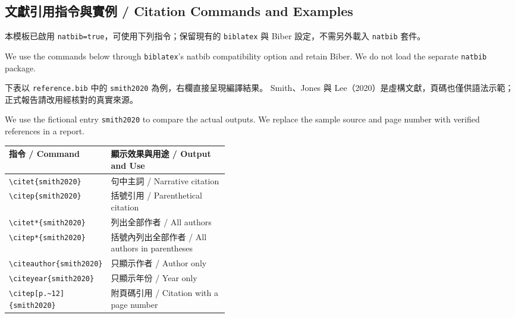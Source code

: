 \documentclass[11pt,a4paper]{article}
\begin{document}
\subsection{文獻引用指令與實例 / Citation Commands and Examples}
\label{sec:citation-examples}
本模板已啟用 \texttt{natbib=true}，可使用下列指令；保留現有的
\texttt{biblatex} 與 Biber 設定，不需另外載入 \texttt{natbib} 套件。

We use the commands below through \texttt{biblatex}'s natbib compatibility option and retain Biber. We do not load the separate \texttt{natbib} package.

下表以 \texttt{reference.bib} 中的 \texttt{smith2020} 為例，右欄直接呈現編譯結果。
Smith、Jones 與 Lee（2020）是虛構文獻，頁碼也僅供語法示範；正式報告請改用經核對的真實來源。

We use the fictional entry \texttt{smith2020} to compare the actual outputs. We replace the sample source and page number with verified references in a report.

\begingroup
\small
\renewcommand{\arraystretch}{1.3}
\noindent\begin{tabularx}{\linewidth}{@{}>{\raggedright\arraybackslash}p{0.43\linewidth}X@{}}
\toprule
指令 / Command & 顯示效果與用途 / Output and Use \\
\midrule
\texttt{\textbackslash{}citet\{smith2020\}} & \citet{smith2020}\newline 句中主詞 / Narrative citation \\
\texttt{\textbackslash{}citep\{smith2020\}} & \citep{smith2020}\newline 括號引用 / Parenthetical citation \\
\texttt{\textbackslash{}citet*\{smith2020\}} & \citet*{smith2020}\newline 列出全部作者 / All authors \\
\texttt{\textbackslash{}citep*\{smith2020\}} & \citep*{smith2020}\newline 括號內列出全部作者 / All authors in parentheses \\
\texttt{\textbackslash{}citeauthor\{smith2020\}} & \citeauthor{smith2020}\newline 只顯示作者 / Author only \\
\texttt{\textbackslash{}citeyear\{smith2020\}} & \citeyear{smith2020}\newline 只顯示年份 / Year only \\
\texttt{\textbackslash{}citep[p.\textasciitilde{}12]\{smith2020\}} & \citep[p.~12]{smith2020}\newline 附頁碼引用 / Citation with a page number \\
\bottomrule
\end{tabularx}
\endgroup
\end{document}
